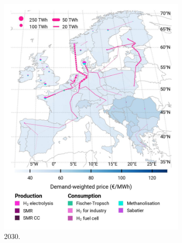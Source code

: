 \documentclass[preprint,12pt,sort&compress]{elsarticle}
\begin{document}
\begin{figure}[htbp]
  \centering
  \begin{subfigure}[t]{0.33\textwidth}
      \vspace{0pt}
      \includegraphics[width=1\textwidth]{maps/pcipmi-national-expansion/base_s_adm___2030-balance_map_H2}
      \caption{ 2030.}
      \label{fig:PCI-n_lt_2030_h2}
  \end{subfigure}
  \begin{subfigure}[t]{0.33\textwidth}
      \vspace{0pt}

\end{subfigure}
\end{figure}
\end{document}
